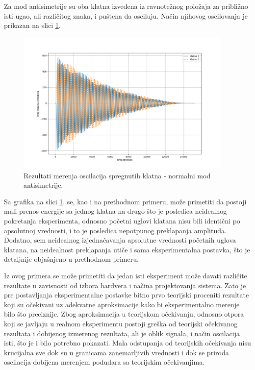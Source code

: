 \documentclass[a4paper, 12pt, diplomski]{etf}
\begin{document}
Za mod antisimetrije su oba klatna izvedena iz ravnotežnog položaja za približno isti ugao, ali različitog znaka, i puštena da osciluju. Način njihovog oscilovanja je prikazan na slici \ref{rez4}.


\begin{figure}[h!]
    \centering
    \includegraphics[width=0.95\textwidth]{py_rez/klatno_antisim.png}
    \caption{Rezultati merenja oscilacija spregnutih klatna - normalni mod antisimetrije.}
    \label{rez4}
\end{figure}

Sa grafika na slici \ref{rez4}. se, kao i na prethodnom primeru, može primetiti da postoji mali prenos energije sa jednog klatna na drugo što je posledica neidealnog pokretanja eksperimenta, odnosno početni uglovi klatana nisu bili identični po apsolutnoj vrednosti, i to je posledica nepotpunog preklapanja amplituda. Dodatno, sem neidealnog izjednačavanja apsolutne vrednosti početnih uglova klatana, na neidealnost preklapanja utiče i sama eksperimentalna postavka, što je detaljnije objašnjeno u prethodnom primeru.




Iz ovog primera se može primetiti da jedan isti eksperiment može davati različite rezultate u zavisnosti od izbora hardvera i načina projektovanja sistema. Zato je pre postavljanja eksperimentalne postavke bitno prvo teorijski proceniti rezultate koji su očekivani uz adekvatne aproksimacije kako bi eksperimentalno merenje bilo što preciznije. Zbog aproksimacija u teorijskom očekivanju, odnosno otpora koji se javljaju u realnom eksperimentu postoji greška od teorijski očekivanog rezultata i dobijenog izmerenog rezultata, ali je oblik signala, i način oscilacija isti, što je i bilo potrebno pokazati. Mala odstupanja od teorijskih očekivanja nisu krucijalna sve dok su u granicama zanemarljivih vrednosti i dok se priroda oscilacija dobijena merenjem podudara sa teorijskim očekivanjima.
\cite{dos}
\end{document}
